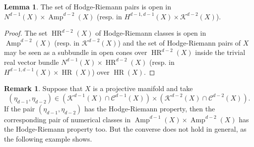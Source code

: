 \documentclass[a4,reqno]{amsart}
\theoremstyle{definition}
\newtheorem{lemma}[theorem]{Lemma}
\newtheorem{remark}[theorem]{Remark}
\def\cC{\mathcal C }
\def\cK{\mathcal K}
\DeclareMathOperator{\Amp}{Amp}
\DeclareMathOperator{\HR}{HR}
\numberwithin{equation}{section}
\begin{document}
\begin{lemma}\label{lem:HRopen}
    The set of Hodge-Riemann pairs is open in $N^{d-1}(X)\times\Amp^{d-2}(X)$ (resp. in $H^{d-1,d-1}(X)\times\cK^{d-2}(X)$).
\end{lemma}
\begin{proof}
    The set $\HR^{d-2}(X)$ of Hodge-Riemann classes is open in $\Amp^{d-2}(X)$ (resp. in $\cK^{d-2}(X)$) and the set of Hodge-Riemann pairs of $X$ may be seen as a subbundle in open cones over $\HR^{d-2}(X)$ inside the trivial real vector bundle $N^{d-1}(X)\times \HR^{d-2}(X)$  (resp. in $H^{d-1,d-1}(X)\times \HR(X)$) over $\HR(X)$.
\end{proof}


\begin{remark}\label{rem:DELV}
Suppose that  $X$ is a projective manifold and take $$(\eta_{d-1},\eta_{d-2})\in(\cK^{d-1}(X)\cap\cC^{d-1}(X))\times (\cK^{d-2}(X)\cap\cC^{d-2}(X)).$$ If the pair $(\eta_{d-1},\eta_{d-2})$ has the Hodge-Riemann property, then the corresponding pair of numerical classes in $\Amp^{d-1}(X)\times\Amp^{d-2}(X) $ has the Hodge-Riemann property too. But the converse does not hold in general, as the following example shows.
\end{remark}
\end{document}
